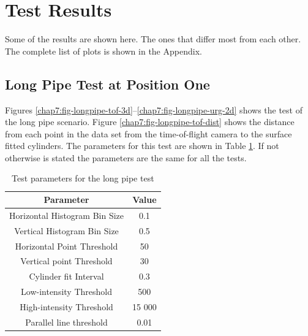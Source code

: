 \section{Test Results}
Some of the results are shown here. The ones that differ most from each other. The
complete list of plots is shown in the Appendix. 

\subsection{Long Pipe Test at Position One}
Figures \ref{chap7:fig-longpipe-tof-3d}--\ref{chap7:fig-longpipe-urg-2d} shows the test of
the long pipe scenario. Figure \ref{chap7:fig-longpipe-tof-dist} shows the distance from each
point in the data set from the time-of-flight camera to the surface fitted cylinders. The
parameters for this test are shown in Table \ref{chap7:tab-longpipe}. If not otherwise is
stated the parameters are the same for all the tests. 
\begin{table}[htbp]
    \centering
    \begin{tabular}{|c|c|}
        \hline
        Parameter   &   Value   \\
        \hline
        Horizontal Histogram Bin Size & 0.1 \\
        Vertical Histogram Bin Size & 0.5 \\
        Horizontal Point Threshold & 50 \\
        Vertical point Threshold & 30 \\
        \hline
        Cylinder fit Interval & 0.3 \\
        Low-intensity Threshold & 500 \\
        High-intensity Threshold & 15 000 \\
        \hline
        Parallel line threshold & 0.01 \\
        \hline
    \end{tabular}
    \caption{Test parameters for the long pipe test}
    \label{chap7:tab-longpipe}
\end{table}
